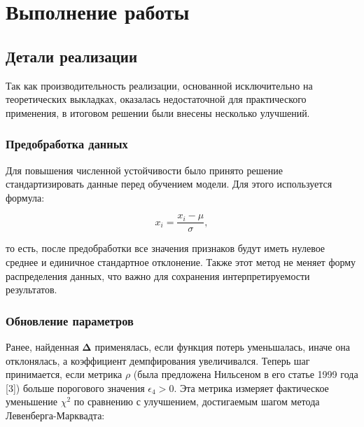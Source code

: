 


\newcommand{\subject}{Дифференциальные уравнения}
\newcommand{\theme}{Аппроксимация данных линейной комбинацией экспоненциальных функций}
\newcommand{\teacher}{Колоницкий С.Б.}
\newcommand{\studentn}{Поглазов Н.В.}
\newcommand{\studentr}{Цыганков Р.М}
\newcommand{\groupnumber}{2384}
\newcommand{\group}{Группа 2384}





\setcounter{page}{2}



\section{Выполнение работы}
\subsection{Детали реализации}

Так как производительность реализации, основанной исключительно на теоретических выкладках, оказалась недостаточной для практического применения, в итоговом решении были внесены несколько улучшений.

\subsubsection{Предобработка данных}

Для повышения численной устойчивости было принято решение стандартизировать данные перед обучением модели. Для этого используется формула:

\[
	x_i = \frac{x_i - \mu}{\sigma},
\]

то есть, после предобработки все значения признаков будут иметь нулевое среднее и единичное стандартное отклонение. Также этот метод не меняет форму распределения данных, что важно для сохранения интерпретируемости результатов.

\subsubsection{Обновление параметров}

Ранее, найденная $\boldsymbol{\Delta}$ применялась, если функция потерь уменьшалась, иначе она отклонялась, а коэффициент демпфирования увеличивался. Теперь шаг принимается, если метрика $\rho$ (была предложена Нильсеном в его статье 1999 года [3]) больше порогового значения $\epsilon_4 > 0$. Эта метрика измеряет фактическое уменьшение $\chi^2$ по сравнению с улучшением, достигаемым шагом метода Левенберга-Марквадта:

